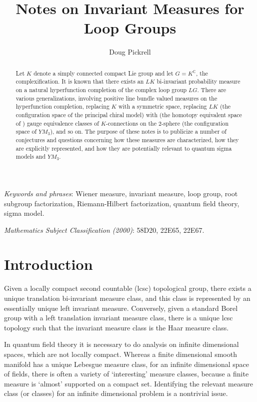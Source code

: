 \documentclass{amsart}
\theoremstyle{conjecture}
\theoremstyle{definition}
\theoremstyle{question}
\theoremstyle{questions}
\theoremstyle{remark}
\theoremstyle{remarks}
\theoremstyle{example}
\numberwithin{equation}{section}
\begin{document}
\title{Notes on Invariant Measures for Loop Groups}


\author{Doug Pickrell}

\begin{abstract}Let $K$ denote a simply connected compact
Lie group and let $G=K^{\mathbb C}$, the complexification.  It is known that
there exists an $LK$ bi-invariant probability measure on
a natural hyperfunction completion of the complex loop group $LG$. There are various generalizations,
involving positive line bundle valued measures on the hyperfunction completion, replacing $K$ with a symmetric space, 
replacing $LK$ (the configuration space of the principal chiral model) with (the homotopy equivalent space of )
gauge equivalence classes of $K$-connections on the 2-sphere (the configuration space of $YM_3$), and so on. 
The purpose of these notes is to publicize a number
of conjectures and questions concerning how
these measures are characterized, how they are explicitly represented, and how they are
potentially relevant to quantum sigma models and $YM_3$.

\end{abstract}



\maketitle

{\it Keywords and phrases}: Wiener measure, invariant measure, loop group,
root subgroup factorization, Riemann-Hilbert factorization, quantum field theory, sigma model.  

{\it Mathematics Subject Classification (2000)}: 58D20, 22E65,
22E67.


\setcounter{section}{-1}

\section{Introduction}

Given a locally compact second countable (lcsc) topological group, there exists a unique 
translation bi-invariant measure class, and this class is represented by an essentially
unique left invariant measure. Conversely, given a standard Borel group with a left translation invariant measure class, 
there is a unique lcsc topology such that the invariant measure class is the Haar measure class.

In quantum field theory it is necessary to do analysis on infinite dimensional spaces, which are not locally compact. Whereas a finite dimensional smooth manifold has
a unique Lebesgue measure class, for an infinite dimensional space of fields, there is often a variety of `interesting' measure classes, because
a finite measure is `almost' supported on a compact set. Identifying the relevant measure class (or classes)
for an infinite dimensional problem is a nontrivial issue.
\end{document}
